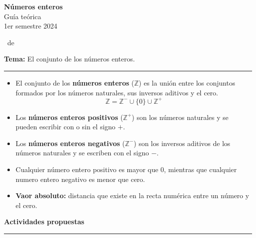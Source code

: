 \documentclass[spanish,letterpaper, 11pt, addpoints, answers]{exam}
\begin{document}

\begin{center}
\textbf{Números enteros} \\
Guía teórica\\
1er semestre 2024
\end{center}
\extraheadheight{-0.5in}

\runningheadrule \extraheadheight{0.15in}

\vspace{0.15in}
\runningheadrule \extraheadheight{0.14in}

\runningfooter{}
              {\thepage\ de \numpages}
              {}
\vspace{0.05in}

\nopointsinmargin
\setlength\linefillthickness{0.1pt}
\setlength\answerlinelength{0.1in}
\vspace{0.1in}
\parbox{6in}{
\textbf{Tema:} El conjunto de los números enteros.}
\vspace{0.15in}
\hrule 

\begin{itemize}
  \item El conjunto de los \textbf{números enteros} ($\mathbb{Z}$) es la unión entre los conjuntos formados por los números naturales, sus inversos aditivos y el cero.
  $$
  \mathbb{Z}=\mathbb{Z^{-}}\cup \{0\}\cup\mathbb{Z^{+}}
  $$
  \item Los \textbf{números enteros positivos} ($\mathbb{Z^+}$) son los números naturales y se pueden escribir con o sin el signo $+$.
  \item Los \textbf{números enteros negativos} ($\mathbb{Z^-}$) son los inversos aditivos de los números naturales y se escriben con el signo $-$.
  \item Cualquier número entero positivo es mayor que 0, mientras que cualquier numero entero negativo es menor que cero.
  \item \textbf{Vaor absoluto:} distancia que existe en la recta numérica entre un número y el cero.
\end{itemize}

\parbox{6in}{
\textbf{Actividades propuestas}}
\vspace{0.15in}
\hrule 
\end{document}
